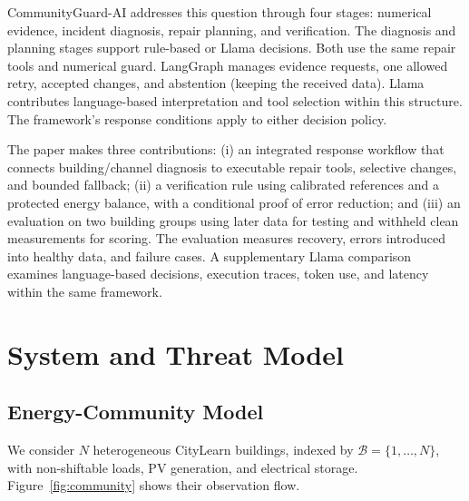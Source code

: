 \documentclass[conference]{IEEEtran}
\begin{document}
CommunityGuard-AI addresses this question through four stages: numerical evidence, incident diagnosis, repair planning, and verification. The diagnosis and planning stages support rule-based or Llama decisions. Both use the same repair tools and numerical guard. LangGraph manages evidence requests, one allowed retry, accepted changes, and abstention (keeping the received data). Llama contributes language-based interpretation and tool selection within this structure. The framework's response conditions apply to either decision policy.

The paper makes three contributions: (i) an integrated response workflow that connects building/channel diagnosis to executable repair tools, selective changes, and bounded fallback; (ii) a verification rule using calibrated references and a protected energy balance, with a conditional proof of error reduction; and (iii) an evaluation on two building groups using later data for testing and withheld clean measurements for scoring. The evaluation measures recovery, errors introduced into healthy data, and failure cases. A supplementary Llama comparison examines language-based decisions, execution traces, token use, and latency within the same framework.

\section{System and Threat Model}

\subsection{Energy-Community Model}

We consider $N$ heterogeneous CityLearn buildings, indexed by $\mathcal{B}=\{1,\ldots,N\}$, with non-shiftable loads, PV generation, and electrical storage. Figure~\ref{fig:community} shows their observation flow.
\end{document}
